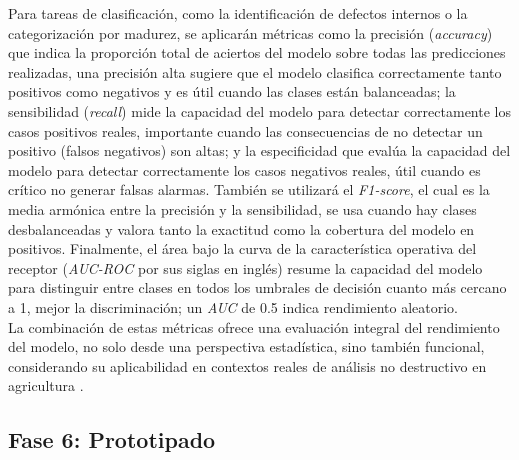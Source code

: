 Para tareas de clasificación, como la identificación de defectos internos o la categorización por madurez, se aplicarán métricas como la precisión (\textit{accuracy}) que indica la proporción total de aciertos del modelo sobre todas las predicciones realizadas, una precisión alta sugiere que el modelo clasifica correctamente tanto positivos como negativos y es útil cuando las clases están balanceadas; la sensibilidad (\textit{recall}) mide la capacidad del modelo para detectar correctamente los casos positivos reales, importante cuando las consecuencias de no detectar un positivo (falsos negativos) son altas; y la especificidad que evalúa la capacidad del modelo para detectar correctamente los casos negativos reales, útil cuando es crítico no generar falsas alarmas. También se utilizará el \textit{F1-score}, el cual es la media armónica entre la precisión y la sensibilidad, se usa cuando hay clases desbalanceadas y valora tanto la exactitud como la cobertura del modelo en positivos. Finalmente, el área bajo la curva de la característica operativa del receptor (\textit{AUC-ROC} por sus siglas en inglés) resume la capacidad del modelo para distinguir entre clases en todos los umbrales de decisión cuanto más cercano a 1, mejor la discriminación; un \textit{AUC} de 0.5 indica rendimiento aleatorio.\\

La combinación de estas métricas ofrece una evaluación integral del rendimiento del modelo, no solo desde una perspectiva estadística, sino también funcional, considerando su aplicabilidad en contextos reales de análisis no destructivo en agricultura \parencite{chlingaryan_machine_2018}.


\subsection{Fase 6: Prototipado}

